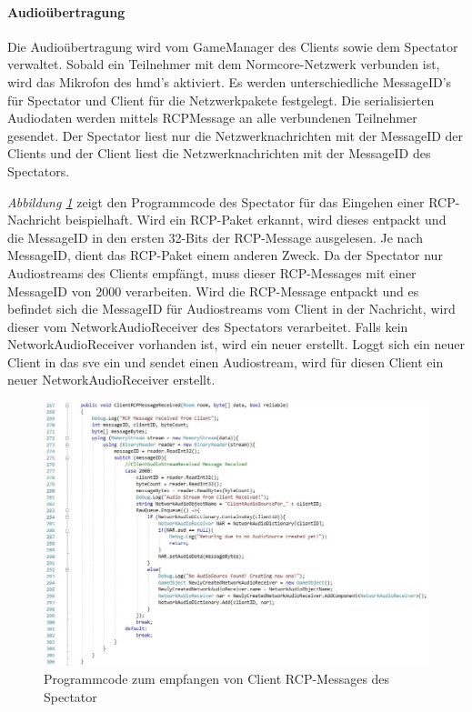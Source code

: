 \documentclass[a4paper,11pt]{article}%
\renewcommand{\\}{\vspace*{0.5\baselineskip} \newline}
\begin{document}
\paragraph{Audioübertragung}
Die Audioübertragung wird vom GameManager des Clients sowie dem Spectator verwaltet. Sobald ein Teilnehmer mit dem Normcore-Netzwerk verbunden ist, wird das Mikrofon des \ac{hmd}'s aktiviert. Es werden unterschiedliche MessageID’s für Spectator und Client für die Netzwerkpakete festgelegt. Die serialisierten Audiodaten werden mittels RCPMessage an alle verbundenen Teilnehmer gesendet. Der Spectator liest nur die Netzwerknachrichten mit der MessageID der Clients und der Client liest die Netzwerknachrichten mit der MessageID des Spectators.

\textit{Abbildung \ref{ClientRCPMessageReceived}} zeigt den Programmcode des Spectator für das Eingehen einer RCP-Nachricht beispielhaft. Wird ein RCP-Paket erkannt, wird dieses entpackt und die MessageID in den ersten 32-Bits der RCP-Message ausgelesen. Je nach MessageID, dient das RCP-Paket einem anderen Zweck. Da der Spectator nur Audiostreams des Clients empfängt, muss dieser RCP-Messages mit einer MessageID von \dq{}2000\dq{} verarbeiten. 
Wird die RCP-Message entpackt und es befindet sich die MessageID für Audiostreams vom Client in der Nachricht, wird dieser vom \dq{}NetworkAudioReceiver\dq{} des Spectators verarbeitet. Falls kein \dq{}NetworkAudioReceiver\dq{} vorhanden ist, wird ein neuer erstellt. Loggt sich ein neuer Client in das \ac{sve} ein und sendet einen Audiostream, wird für diesen Client ein neuer \dq{}NetworkAudioReceiver\dq{} erstellt.

\begin{figure}[H]
		\begin{footnotesize}
		\centering
			\includegraphics[width=\textwidth]{Abbildungen/ClientRCPMessageReceived.jpg}	
			\caption[RCP-Message handling]{Programmcode zum empfangen von Client RCP-Messages des Spectator}
			\label{ClientRCPMessageReceived}
		\end{footnotesize}
	\end{figure}
	
\end{document}
